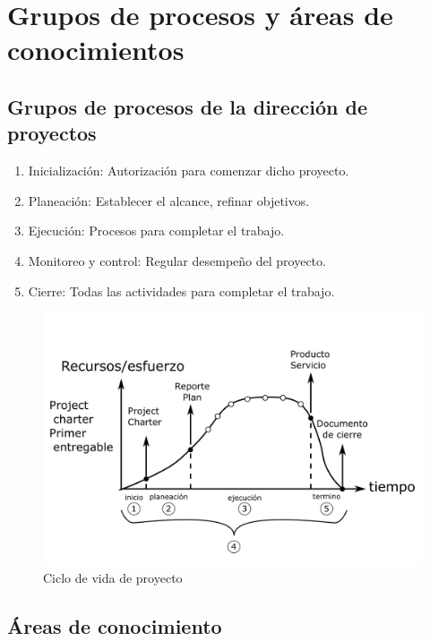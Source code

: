 \section{Grupos de procesos y áreas de conocimientos}

\subsection{Grupos de procesos de la dirección de proyectos}

\begin{enumerate}
    \item Inicialización: Autorización para comenzar dicho proyecto.
    
    \item Planeación: Establecer el alcance, refinar objetivos. 
    
    \item Ejecución: Procesos para completar el trabajo.
    
    \item Monitoreo y control: Regular desempeño del proyecto.
    
    \item Cierre: Todas las actividades para completar el trabajo.
\end{enumerate}

\begin{figure}[h!]
    \centering
        \includegraphics[scale=0.30]{Manufactura Integrada por Computadora Figuras/Figura02 Ciclo de Vida de Proyecto.png}
        \caption{Ciclo de vida de proyecto}
\end{figure}

\subsection{Áreas  de conocimiento}

